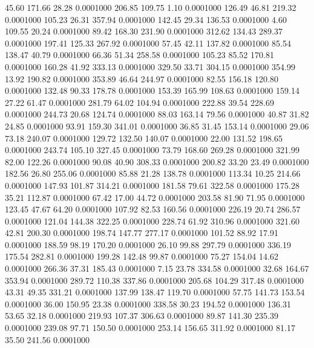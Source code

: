   45.60  171.66   28.28   0.0001000
 206.85  109.75    1.10   0.0001000
 126.49   46.81  219.32   0.0001000
 105.23   26.31  357.94   0.0001000
 142.45   29.34  136.53   0.0001000
   4.60  109.55   20.24   0.0001000
  89.42  168.30  231.90   0.0001000
 312.62  134.43  289.37   0.0001000
 197.41  125.33  267.92   0.0001000
  57.45   42.11  137.82   0.0001000
  85.54  138.47   40.79   0.0001000
  66.36   51.34  258.58   0.0001000
 105.23   85.52  170.81   0.0001000
 160.28   41.92  333.13   0.0001000
 329.50   33.71  304.15   0.0001000
 354.99   13.92  190.82   0.0001000
 353.89   46.64  244.97   0.0001000
  82.55  156.18  120.80   0.0001000
 132.48   90.33  178.78   0.0001000
 153.39  165.99  108.63   0.0001000
 159.14   27.22   61.47   0.0001000
 281.79   64.02  104.94   0.0001000
 222.88   39.54  228.69   0.0001000
 244.73   20.68  124.74   0.0001000
  88.03  163.14   79.56   0.0001000
  40.87   31.82   24.85   0.0001000
  93.91  159.30  341.01   0.0001000
  36.85   31.45  153.14   0.0001000
  29.06   73.18  240.07   0.0001000
 129.72  132.50  140.07   0.0001000
  22.00  131.52  198.65   0.0001000
 243.74  105.10  327.45   0.0001000
  73.79  168.60  269.28   0.0001000
 321.99   82.00  122.26   0.0001000
  90.08   40.90  308.33   0.0001000
 200.82   33.20   23.49   0.0001000
 182.56   26.80  255.06   0.0001000
  85.88   21.28  138.78   0.0001000
 113.34   10.25  214.66   0.0001000
 147.93  101.87  314.21   0.0001000
 181.58   79.61  322.58   0.0001000
 175.28   35.21  112.87   0.0001000
  67.42   17.00   44.72   0.0001000
 203.58   81.90   71.95   0.0001000
 123.45   47.67   64.20   0.0001000
 107.92   82.53  160.56   0.0001000
 226.19   20.74  286.57   0.0001000
 121.04  144.38  322.25   0.0001000
 228.74   61.92  310.96   0.0001000
 321.60   42.81  200.30   0.0001000
 198.74  147.77  277.17   0.0001000
 101.52   88.92   17.91   0.0001000
 188.59   98.19  170.20   0.0001000
  26.10   99.88  297.79   0.0001000
 336.19  175.54  282.81   0.0001000
 199.28  142.48   99.87   0.0001000
  75.27  154.04   14.62   0.0001000
 266.36   37.31  185.43   0.0001000
   7.15   23.78  334.58   0.0001000
  32.68  164.67  353.94   0.0001000
 289.72  110.38  337.86   0.0001000
 205.68  104.29  317.48   0.0001000
  43.31   49.35  331.21   0.0001000
 137.99  138.47  119.70   0.0001000
  57.75  141.73  153.54   0.0001000
  36.00  150.95   23.38   0.0001000
 338.58   30.23  194.52   0.0001000
 136.31   53.65   32.18   0.0001000
 219.93  107.37  306.63   0.0001000
  89.87  141.30  235.39   0.0001000
 239.08   97.71  150.50   0.0001000
 253.14  156.65  311.92   0.0001000
  81.17   35.50  241.56   0.0001000
